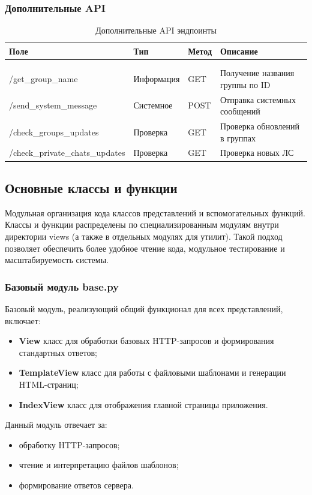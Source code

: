 \subsubsection{Дополнительные API}

\begin{xltabular}{\textwidth}{|l|l|p{1.7cm}|X|}
	\caption{Дополнительные API эндпоинты}\label{tab:additional_api} \\ \hline
	\centrow Поле & \centrow Тип & \centrow Метод & \centrow Описание \\ \hline
	 &  &  &  \\ \hline
	\endfirsthead
	 &  &  &  \\ \hline
	\finishhead
	/get\_group\_name & Информация & GET & Получение названия группы по ID \\ \hline 
	/send\_system\_message & Системное & POST & Отправка системных сообщений \\ \hline 
	/check\_groups\_updates & Проверка & GET & Проверка обновлений в группах \\ \hline 
	/check\_private\_chats\_updates & Проверка & GET & Проверка новых ЛС \\ \hline 
\end{xltabular}


\subsection{Основные классы и функции}

Модульная организация кода классов представлений и вспомогательных функций. Классы и функции распределены по специализированным модулям внутри директории views (а также в отдельных модулях для утилит). Такой подход позволяет обеспечить более удобное чтение кода, модульное тестирование и масштабируемость системы.

\subsubsection{Базовый модуль base.py} 
Базовый модуль, реализующий общий функционал для всех представлений, включает:
\begin{itemize}
	\item \textbf{View} класс для обработки базовых HTTP-запросов и формирования стандартных ответов;
	\item \textbf{TemplateView} класс для работы с файловыми шаблонами и генерации HTML-страниц;
	\item \textbf{IndexView} класс для отображения главной страницы приложения.
\end{itemize}
Данный модуль отвечает за:
\begin{itemize}
	\item обработку HTTP-запросов;
	\item чтение и интерпретацию файлов шаблонов;
	\item формирование ответов сервера.
\end{itemize}

